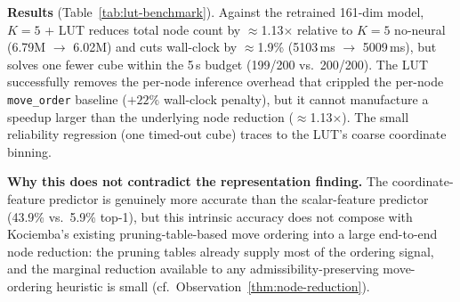 \documentclass[graybox]{svmult}
\begin{document}
\begin{table}[!t]
\centering
\caption{LUT vs.\ per-node neural inference (200 scrambles, seed 42, $K{=}5$, 5\,s timeout). Baseline, $K{=}5$ none, and $K{=}5$ + LUT rows are drawn from \texttt{results/benchmark\_200\_retrained.json}. The per-node \texttt{move\_order} row uses the scalar-feature pickle and illustrates the inference-cost regime that LUT distillation is designed to remove; its absolute numbers should be read as order-of-magnitude comparisons.}
\label{tab:lut-benchmark}
\end{table}

\textbf{Results} (Table~\ref{tab:lut-benchmark}). Against the retrained 161-dim model, $K{=}5$ + LUT reduces total node count by $\approx$1.13$\times$ relative to $K{=}5$ no-neural (6.79M $\to$ 6.02M) and cuts wall-clock by $\approx$1.9\% (5103\,ms $\to$ 5009\,ms), but solves one fewer cube within the 5\,s budget (199/200 vs.\ 200/200). The LUT successfully removes the per-node inference overhead that crippled the per-node \texttt{move\_order} baseline ($+22\%$ wall-clock penalty), but it cannot manufacture a speedup larger than the underlying node reduction ($\approx$1.13$\times$). The small reliability regression (one timed-out cube) traces to the LUT's coarse coordinate binning.

\textbf{Why this does not contradict the representation finding.} The coordinate-feature predictor is genuinely more accurate than the scalar-feature predictor (43.9\% vs.\ 5.9\% top-1), but this intrinsic accuracy does not compose with Kociemba's existing pruning-table-based move ordering into a large end-to-end node reduction: the pruning tables already supply most of the ordering signal, and the marginal reduction available to any admissibility-preserving move-ordering heuristic is small (cf.\ Observation~\ref{thm:node-reduction}).
\end{document}
